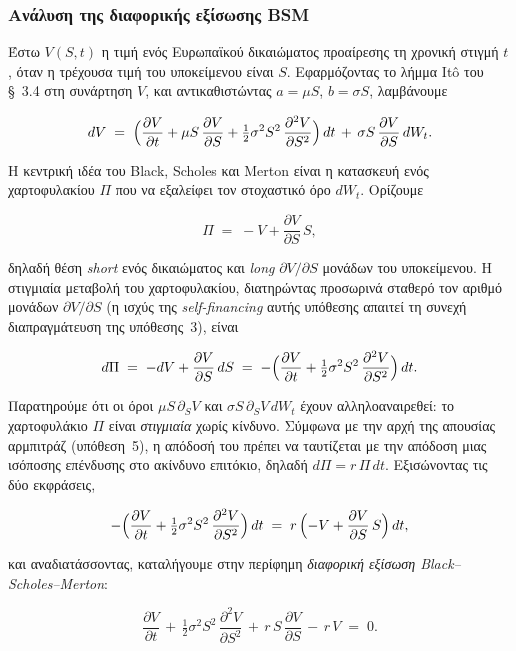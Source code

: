 \documentclass[12pt]{article}
\begin{document}
\subsubsection{Ανάλυση της διαφορικής εξίσωσης BSM}

Έστω $V(S, t)$ η τιμή ενός Ευρωπαϊκού δικαιώματος προαίρεσης τη χρονική στιγμή $t$, όταν η τρέχουσα τιμή του υποκείμενου είναι $S$. Εφαρμόζοντας το λήμμα Itô του \S~3.4 στη συνάρτηση $V$, και αντικαθιστώντας $a = \mu S$, $b = \sigma S$, λαμβάνουμε

$$
dV \;=\; \Bigl(\frac{\partial V}{\partial t} + \mu S\,\frac{\partial V}{\partial S} + \tfrac{1}{2}\sigma^2 S^2\,\frac{\partial^2 V}{\partial S^2}\Bigr)\,dt \,+\, \sigma S\,\frac{\partial V}{\partial S}\,dW_t.
$$

Η κεντρική ιδέα του Black, Scholes και Merton είναι η κατασκευή ενός χαρτοφυλακίου $\Pi$ που να εξαλείφει τον στοχαστικό όρο $dW_t$. Ορίζουμε

$$
\Pi \;=\; -V + \frac{\partial V}{\partial S}\,S,
$$

δηλαδή θέση \emph{short} ενός δικαιώματος και \emph{long} $\partial V/\partial S$ μονάδων του υποκείμενου. Η στιγμιαία μεταβολή του χαρτοφυλακίου, διατηρώντας προσωρινά σταθερό τον αριθμό μονάδων $\partial V/\partial S$ (η ισχύς της \emph{self-financing} αυτής υπόθεσης απαιτεί τη συνεχή διαπραγμάτευση της υπόθεσης~3), είναι

$$
d\Pi \;=\; -dV + \frac{\partial V}{\partial S}\,dS \;=\; -\Bigl(\frac{\partial V}{\partial t} + \tfrac{1}{2}\sigma^2 S^2\,\frac{\partial^2 V}{\partial S^2}\Bigr)\,dt.
$$

Παρατηρούμε ότι οι όροι $\mu S\,\partial_S V$ και $\sigma S\,\partial_S V\,dW_t$ έχουν αλληλοαναιρεθεί: το χαρτοφυλάκιο $\Pi$ είναι \emph{στιγμιαία} χωρίς κίνδυνο. Σύμφωνα με την αρχή της απουσίας αρμπιτράζ (υπόθεση~5), η απόδοσή του πρέπει να ταυτίζεται με την απόδοση μιας ισόποσης επένδυσης στο ακίνδυνο επιτόκιο, δηλαδή $d\Pi = r\,\Pi\,dt$. Εξισώνοντας τις δύο εκφράσεις,

$$
-\Bigl(\frac{\partial V}{\partial t} + \tfrac{1}{2}\sigma^2 S^2\,\frac{\partial^2 V}{\partial S^2}\Bigr)\,dt \;=\; r\,\Bigl(-V + \frac{\partial V}{\partial S}\,S\Bigr)\,dt,
$$

και αναδιατάσσοντας, καταλήγουμε στην περίφημη \emph{διαφορική εξίσωση Black–Scholes–Merton}:

$$
\frac{\partial V}{\partial t} \,+\, \tfrac{1}{2}\sigma^2 S^2\,\frac{\partial^2 V}{\partial S^2} \,+\, r\,S\,\frac{\partial V}{\partial S} \,-\, r\,V \;=\; 0.
$$
\end{document}
